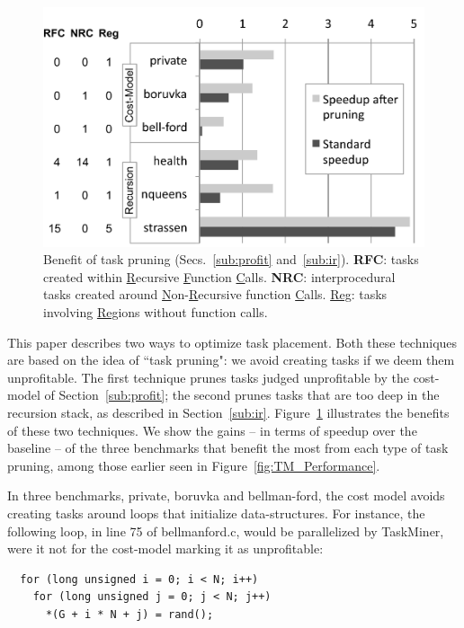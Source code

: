 \documentclass[sigplan,10pt,screen]{acmart}
\newcommand\Taskminer{\mbox{\textsf{TaskMiner}}}
\begin{document}
\begin{figure}[b!]
\begin{center}
\includegraphics[width=1\columnwidth]{images/Optimizations}
\caption{Benefit of task pruning (Secs.~\ref{sub:profit} and~\ref{sub:ir}).
\textbf{RFC}: tasks created within \underline{R}ecursive \underline{F}unction
\underline{C}alls.
\textbf{NRC}: interprocedural tasks created around
\underline{N}on-\underline{R}ecursive function \underline{C}alls.
\underline{Reg}: tasks involving \underline{Reg}ions without function calls.
}
\label{fig:Optimizations}
\end{center}
\end{figure}

This paper describes two ways to optimize task placement.
Both these techniques are based on the idea of ``task pruning": we avoid
creating tasks if we deem them unprofitable.
The first technique prunes tasks judged unprofitable by the cost-model of
Section~\ref{sub:profit}; the second prunes tasks that are too deep in the
recursion stack, as described in Section~\ref{sub:ir}.
Figure~\ref{fig:Optimizations} illustrates the benefits of these two techniques.
We show the gains -- in terms of speedup over the baseline -- of the three
benchmarks that
benefit the most from each type of task pruning, among those earlier seen in
Figure~\ref{fig:TM_Performance}.

In three benchmarks, \textsf{private}, \textsf{boruvka} and
\textsf{bellman-ford}, the cost model avoids creating tasks around loops that
initialize data-structures.
For instance, the following loop, in line 75 of \textsf{bellmanford.c}, would be
parallelized by \Taskminer, were it not for the cost-model marking it as
unprofitable:

\begin{verbatim}
  for (long unsigned i = 0; i < N; i++)
    for (long unsigned j = 0; j < N; j++)
      *(G + i * N + j) = rand();
\end{verbatim}
\end{document}
